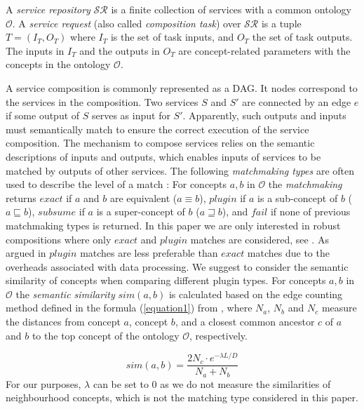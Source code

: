 \documentclass{llncs}
\begin{document}
A \emph{service repository} $\mathcal{SR}$ is a finite collection of services with a common ontology $\mathcal{O}$. A \emph{service request} (also called \emph{composition task}) over $\mathcal{SR}$ is a tuple $T=(I_{T}, O_{T})$ where $I_{T}$ is the set of task inputs, and $O_{T}$ the set of task outputs. The inputs in $I_{T}$ and the outputs in $O_{T}$ are concept-related parameters with the concepts in the ontology $\mathcal{O}$.

A service composition is commonly represented as a DAG. It nodes correspond to the services in the composition. Two services $S$ and $S'$ are connected by an edge $e$ if some output of $S$ serves as input for $S'$. Apparently, such outputs and inputs must semantically match to ensure the correct execution of the service composition. 
The mechanism to compose services relies on the semantic descriptions of inputs and outputs, which enables inputs of services to be matched by outputs of other services. The following \emph{matchmaking types} are often used to describe the level of a match \cite{paolucci2002semantic}: For concepts $a, b$ in $\mathcal{O}$ the \emph{matchmaking} returns $exact$ if $a$ and $b$ are equivalent ($a \equiv b$), $plugin$ if $a$ is a sub-concept of $b$ ($a \sqsubseteq b$), $subsume$ if $a$ is a super-concept of $b$ ($a \sqsupseteq b$), and $fail$ if none of previous matchmaking types is returned.
In this paper we are only interested in robust compositions where only $exact$ and $plugin$ matches are considered, see \cite{lecue2009optimizing}. 
%
As argued in \cite{lecue2009optimizing} $plugin$ matches are less preferable than $exact$ matches due to the overheads associated with data processing. We suggest to consider the semantic similarity of concepts when comparing different plugin types. For concepts $a, b$ in $\mathcal{O}$ the \emph{semantic similarity} $sim(a, b)$ is calculated based on the edge counting method defined in the formula (\ref{equation1}) from \cite{shet2012new}, where $N_a$, $N_b$ and $N_c$ measure the distances from concept $a$, concept $b$, and a closest common ancestor $c$ of $a$ and $b$ to the top concept of the ontology $\mathcal{O}$, respectively. 
\vspace{-0.2cm}

\begin{equation}
sim(a, b){=} \frac{2N_c \cdot e^{-\lambda L/D} }{N_{a}+N_{b}}
\label{equation1}
\end{equation}
\noindent For our purposes, $\lambda$ can be set to 0 as we do not measure the similarities of neighbourhood concepts, which is not the matching type considered in this paper. 
\end{document}
